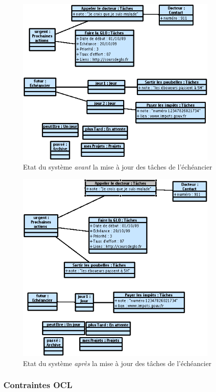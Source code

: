 \begin{figure}[!ht]
\begin{center}
\includegraphics[width=10cm]{images/Instantane_Review_1.png}
\caption{Etat du système \emph{avant} la mise à jour des tâches de l'échéancier}
\label{review1}
\end{center}
\end{figure}

\begin{figure}[!ht]
\begin{center}
\includegraphics[width=10cm]{images/Instantane_Review_2.png}
\caption{Etat du système \emph{après} la mise à jour des tâches de l'échéancier}
\label{review2}
\end{center}
\end{figure}

\subsubsection{Contraintes OCL}

